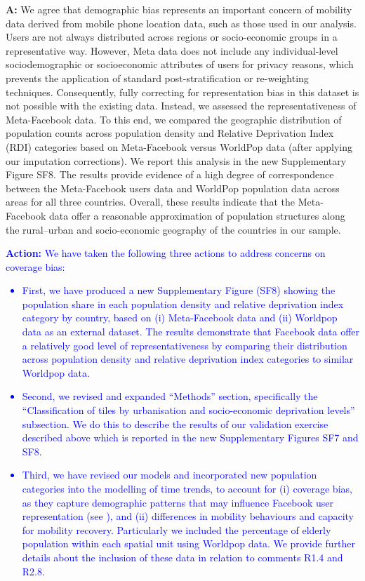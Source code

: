 \documentclass[12pt,a4paper,oneside, reqno]{amsart}
\begin{document}
\setlength{\leftskip}{1cm}\textbf{A:} We agree that demographic bias represents an important concern of mobility data derived from mobile phone location data, such as those used in our analysis. Users are not always distributed across regions or socio-economic groups in a representative way. However, Meta data does not include any individual-level sociodemographic or socioeconomic attributes of users for privacy reasons, which prevents the application of standard post-stratification or re-weighting techniques. Consequently, fully correcting for representation bias in this dataset is not possible with the existing data. Instead, we assessed the representativeness of Meta-Facebook data. To this end, we compared the geographic distribution of population counts across population density and Relative Deprivation Index (RDI) categories based on Meta-Facebook versus WorldPop data (after applying our imputation corrections). We report this analysis in the new Supplementary Figure SF8. The results provide evidence of a high degree of correspondence between the Meta-Facebook users data and WorldPop population data across areas for all three countries. Overall, these results indicate that the Meta-Facebook data offer a reasonable approximation of population structures along the rural–urban and socio-economic geography of the countries in our sample.

\textcolor{blue}{
\textbf{Action:} We have taken the following three actions to address concerns on coverage bias:
\begin{itemize}[noitemsep, topsep=0pt]
    \item First, we have produced a new Supplementary Figure (SF8) showing the population share in each population density and relative deprivation index category by country, based on (i) Meta-Facebook data and (ii) Worldpop data as an external dataset. The results demonstrate that Facebook data offer a relatively good level of representativeness by comparing their distribution across population density and relative deprivation index categories to similar Worldpop data.
    \item Second, we revised and expanded ``Methods'' section, specifically the ``Classification of tiles by urbanisation and socio-economic deprivation levels'' subsection. We do this to describe the results of our validation exercise described above which is reported in the new Supplementary Figures SF7 and SF8.
    \item Third, we have revised our models and incorporated new population categories into the modelling of time trends, to account for (i) coverage bias, as they capture demographic patterns that may influence Facebook user representation (see \parencite{cabrera2025bias}), and (ii) differences in mobility behaviours and capacity for mobility recovery. Particularly we included the percentage of elderly population within each spatial unit using Worldpop data. We provide further details about the inclusion of these data in relation to comments R1.4 and R2.8.
\end{itemize}
}
\end{document}
